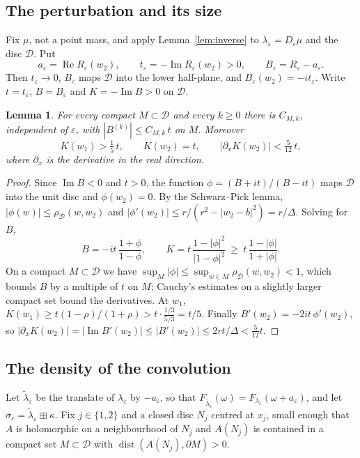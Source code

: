\documentclass[11pt]{amsart}
\newtheorem{lemma}[theorem]{Lemma}
\theoremstyle{definition}
\theoremstyle{remark}
\numberwithin{equation}{section}
\newcommand{\bp}{\boxplus}
\newcommand{\eps}{\varepsilon}
\begin{document}
\subsection{The perturbation and its size}
Fix $\mu$, not a point mass, and apply Lemma~\ref{lem:inverse} to $\lambda_\eps=D_\eps\mu$ and the disc $\mathcal D$. Put
\[
a_\eps=\operatorname{Re}R_\eps(w_2),\qquad t_\eps=-\operatorname{Im}R_\eps(w_2)>0,\qquad B_\eps=R_\eps-a_\eps .
\]
Then $t_\eps\to0$, $B_\eps$ maps $\mathcal D$ into the lower half-plane, and $B_\eps(w_2)=-it_\eps$. Write $t=t_\eps$, $B=B_\eps$ and $K=-\operatorname{Im}B>0$ on $\mathcal D$.

\begin{lemma}\label{lem:SP}
For every compact $M\subset\mathcal D$ and every $k\ge0$ there is $C_{M,k}$, independent of $\eps$, with $|B^{(k)}|\le C_{M,k}\,t$ on $M$. Moreover
\[
K(w_1)>\tfrac15\,t,\qquad K(w_2)=t,\qquad |\partial_xK(w_2)|<\tfrac5{12}\,t,
\]
where $\partial_x$ is the derivative in the real direction.
\end{lemma}

\begin{proof}
Since $\operatorname{Im}B<0$ and $t>0$, the function $\phi=(B+it)/(B-it)$ maps $\mathcal D$ into the unit disc and $\phi(w_2)=0$. By the Schwarz--Pick lemma, $|\phi(w)|\le\rho_{\mathcal D}(w,w_2)$ and $|\phi'(w_2)|\le r/(r^2-|w_2-b|^2)=r/\Delta$. Solving for $B$,
\[
B=-it\,\frac{1+\phi}{1-\phi},\qquad K=t\,\frac{1-|\phi|^2}{|1-\phi|^2}\ \ge\ t\,\frac{1-|\phi|}{1+|\phi|}.
\]
On a compact $M\subset\mathcal D$ we have $\sup_M|\phi|\le\sup_{w\in M}\rho_{\mathcal D}(w,w_2)<1$, which bounds $B$ by a multiple of $t$ on $M$; Cauchy's estimates on a slightly larger compact set bound the derivatives. At $w_1$, $K(w_1)\ge t(1-\rho)/(1+\rho)>t\cdot\frac{1/3}{5/3}=t/5$. Finally $B'(w_2)=-2it\,\phi'(w_2)$, so $|\partial_xK(w_2)|=|\operatorname{Im}B'(w_2)|\le|B'(w_2)|\le 2rt/\Delta<\frac5{12}t$.
\end{proof}

\subsection{The density of the convolution}
Let $\tilde\lambda_\eps$ be the translate of $\lambda_\eps$ by $-a_\eps$, so that $F_{\tilde\lambda_\eps}(\omega)=F_{\lambda_\eps}(\omega+a_\eps)$, and let $\sigma_\eps=\tilde\lambda_\eps\bp\kappa$. Fix $j\in\{1,2\}$ and a closed disc $N_j$ centred at $x_j$, small enough that $A$ is holomorphic on a neighbourhood of $N_j$ and $A(N_j)$ is contained in a compact set $M\subset\mathcal D$ with $\operatorname{dist}(A(N_j),\partial M)>0$.
\end{document}
